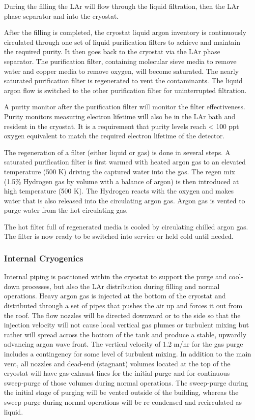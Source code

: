 During the filling the LAr will flow through the liquid filtration, then the LAr phase separator and into the cryostat.

After the filling is completed, the cryostat liquid argon inventory is continuously circulated through one set of liquid purification filters to achieve and maintain the required purity. It then goes back to the cryostat via the LAr phase separator. The purification filter, containing molecular sieve media to remove water and copper media to remove oxygen, will become saturated. The nearly saturated purification filter is regenerated to vent the contaminants. The liquid argon flow is switched to the other purification filter for uninterrupted filtration.

A purity monitor after the purification filter will monitor the filter effectiveness. Purity monitors measuring electron lifetime will also be in the LAr bath and resident in the cryostat. It is a requirement that purity levels reach < 100 ppt oxygen equivalent to match the required electron lifetime of the detector. 

The regeneration of a filter (either liquid or gas) is done in several steps. A saturated purification filter is first warmed with heated argon gas to an elevated temperature (500 K) driving the captured water into the gas. The regen mix (1.5\% Hydrogen gas by volume with a balance of argon) is then introduced at high temperature (500 K). The Hydrogen reacts with the oxygen and makes water that is also released into the circulating argon gas. Argon gas is vented to purge water from the hot circulating gas. 

The hot filter full of regenerated media is cooled by circulating chilled argon gas. The filter is now ready to be switched into service or held cold until needed. 

\subsubsection{Internal Cryogenics}

Internal piping is positioned within the cryostat to support the purge and cool-down processes, but also the LAr distribution during filling and normal operations. Heavy argon gas is injected at the bottom of the cryostat and distributed through a set of pipes that pushes the air up and forces it out from the roof. The flow nozzles will be directed downward or to the side so that the injection velocity will not cause local vertical gas plumes or turbulent mixing but rather will spread across the bottom of the tank and produce a stable, upwardly advancing argon wave front. The vertical velocity of 1.2 m/hr for the gas purge includes a contingency for some level of turbulent mixing. In addition to the main vent, all nozzles and dead-end (stagnant) volumes located at the top of the cryostat will have gas-exhaust lines for the initial purge and for continuous sweep-purge of those volumes during normal operations. The sweep-purge during the initial stage of purging will be vented outside of the building, whereas the sweep-purge during normal operations will be re-condensed and recirculated as liquid. 

